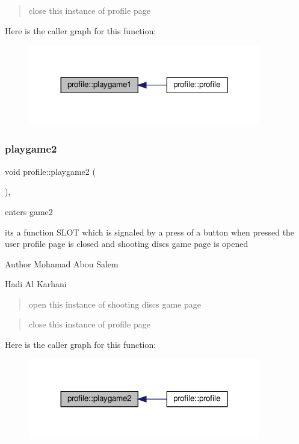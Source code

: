\begin{quote}
close this instance of profile page \end{quote}
Here is the caller graph for this function\+:
\nopagebreak
\begin{figure}[H]
\begin{center}
\leavevmode
\includegraphics[width=287pt]{classprofile_a6255c697ba58203b5d9834fea1329cb1_icgraph}
\end{center}
\end{figure}
\mbox{\label{classprofile_a89dd2d07162af36d2aeebc485b1e878c}} 
\subsubsection{\texorpdfstring{playgame2}{playgame2}}
{\footnotesize\ttfamily void profile\+::playgame2 (\begin{DoxyParamCaption}{ }\end{DoxyParamCaption})\hspace{0.3cm}{\ttfamily [private]}, {\ttfamily [slot]}}



enters game2 

its a function S\+L\+OT which is signaled by a press of a button when pressed the user profile page is closed and shooting discs game page is opened

\begin{DoxyAuthor}{Author}
Mohamad Abou Salem 

Hadi Al Karhani 
\end{DoxyAuthor}
\begin{quote}
open this instance of shooting discs game page \end{quote}


\begin{quote}
close this instance of profile page \end{quote}
Here is the caller graph for this function\+:
\nopagebreak
\begin{figure}[H]
\begin{center}
\leavevmode
\includegraphics[width=287pt]{classprofile_a89dd2d07162af36d2aeebc485b1e878c_icgraph}
\end{center}
\end{figure}


